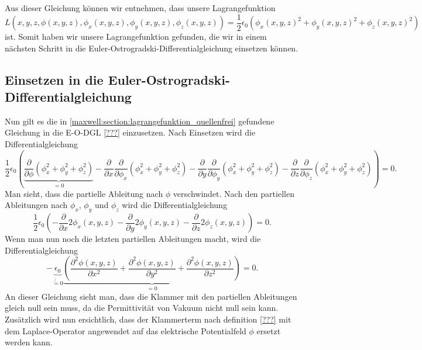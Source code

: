 Aus dieser Gleichung können wir entnehmen, dass unsere Lagrangefunktion
\begin{equation}
	L(x,y,z,\phi(x,y,z),\phi_x(x,y,z),\phi_y(x,y,z),\phi_z(x,y,z))
	=
	\frac{1}{2}\epsilon_0\left(\phi_x(x,y,z)^2 + \phi_y(x,y,z)^2 + \phi_z(x,y,z)^2\right)
	\label{maxwell:section:lagrangefunktion_quellenfrei}
\end{equation}
ist.
Somit haben wir unsere Lagrangefunktion gefunden, die wir in einem nächsten Schritt in die Euler-Ostrogradski-Differentialgleichung einsetzen können.

\subsection{Einsetzen in die Euler-Ostrogradski-Differentialgleichung}
Nun gilt es die in \eqref{maxwell:section:lagrangefunktion_quellenfrei} gefundene Gleichung in die E-O-DGL \ref{???} einzusetzen.
Nach Einsetzen wird die Differentialgleichung
\[
\frac{1}{2}\epsilon_0\left(\underbrace{\frac{\partial}{\partial\phi}\left(\phi_x^2 + \phi_y^2 + \phi_z^2\right)}_{=0} - \frac{\partial}{\partial x}\frac{\partial}{\partial \phi_x}\left(\phi_x^2 + \phi_y^2 + \phi_z^2\right) - 
\frac{\partial}{\partial y}\frac{\partial}{\partial \phi_y}\left(\phi_x^2 + \phi_y^2 + \phi_z^2\right) - 
\frac{\partial}{\partial z}\frac{\partial}{\partial \phi_z}\left(\phi_x^2 + \phi_y^2 + \phi_z^2\right)\right)
=
0.
\]
Man sieht, dass die partielle Ableitung nach $\phi$ verschwindet.
Nach den partiellen Ableitungen nach $\phi_x$, $\phi_y$ und $\phi_z$ wird die Differentialgleichung
\[
\frac{1}{2}\epsilon_0\left(-\frac{\partial}{\partial x}2\phi_x(x,y,z) - \frac{\partial}{\partial y}2\phi_y(x,y,z) - \frac{\partial}{\partial z}2\phi_z(x,y,z)\right)
=
0.
\]
Wenn man nun noch die letzten partiellen Ableitungen macht, wird die Differentialgleichung
\begin{equation}
	- \underbrace{\epsilon_0}_{\not{=}0}\underbrace{\left(\frac{\partial^2\phi(x,y,z)}{\partial x^2} + \frac{\partial^2\phi(x,y,z)}{\partial y^2} + \frac{\partial^2\phi(x,y,z)}{\partial z^2}\right)}_{=0}
	=
	0.
	\label{maxwell:section:laplace_gleichung_1}
\end{equation}
An dieser Gleichung sieht man, dass die Klammer mit den partiellen Ableitungen gleich null sein muss, da die Permittivität von Vakuum nicht null sein kann.
Zusätzlich wird nun ersichtlich, dass der Klammerterm nach definition \ref{???} mit dem Laplace-Operator angewendet auf das elektrische Potentialfeld $\phi$ ersetzt werden kann.
